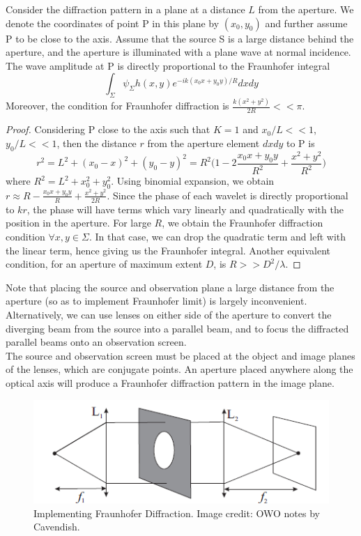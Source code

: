 \documentclass[a4paper]{article}
\begin{document}
\begin{cor}
Consider the diffraction pattern in a plane at a distance $L$ from the aperture. We denote the coordinates of point P in this plane by $(x_0,y_0)$ and further assume P to be close to the axis. Assume that the source S is a large distance behind the aperture, and the aperture is illuminated with a plane wave at normal incidence. The wave amplitude at P is directly proportional to the Fraunhofer integral
$$\int_\Sigma\psi_\Sigma h(x,y)e^{-ik(x_0x+y_0y)/R}dxdy$$
Moreover, the condition for Fraunhofer diffraction is $\frac{k(x^2+y^2)}{2R}<<\pi$.
\end{cor}
\begin{proof}
Considering P close to the axis such that $K=1$ and $x_0/L<<1$, $y_0/L<<1$, then the distance $r$ from the aperture element $dxdy$ to P is
$$r^2=L^2+(x_0-x)^2+(y_0-y)^2=R^2\bigg(1-2\frac{x_0x+y_0y}{R^2}+\frac{x^2+y^2}{R^2}\bigg)$$
where $R^2=L^2+x_0^2+y_0^2$. Using binomial expansion, we obtain $r\approx R-\frac{x_0x+y_0y}{R}+\frac{x^2+y^2}{2R}$. Since the phase of each wavelet is directly proportional to $kr$, the phase will have terms which vary linearly and quadratically with the position in the aperture. For large $R$, we obtain the Fraunhofer diffraction condition $\forall x,y\in\Sigma$. In that case, we can drop the quadratic term and left with the linear term, hence giving us the Fraunhofer integral. Another equivalent condition, for an aperture of maximum extent $D$, is $R>>D^2/\lambda$.
\end{proof}
\begin{Note}
Note that placing the source and observation plane a large distance from the aperture (so as to implement Fraunhofer limit) is largely inconvenient. Alternatively, we can use lenses on either side of the aperture to convert the diverging beam from the source into a parallel beam, and to focus the diffracted parallel beams onto an observation screen.\\[5pt]
The source and observation screen must be placed at the object and image planes of the lenses, which are conjugate points. An aperture placed anywhere along the optical axis will produce a Fraunhofer diffraction pattern in the image plane.
\end{Note}
\begin{figure}[H]
    \centering
    \includegraphics[scale=0.75]{fraunhofer.PNG}
    \caption{Implementing Fraunhofer Diffraction. Image credit: OWO notes by Cavendish.}
\end{figure}
\end{document}
